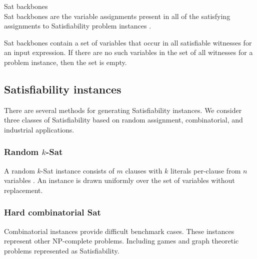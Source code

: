 \begin{definition}
{\sc Sat} backbones\\
{\sc Sat} backbones are the variable assignments present in all of the satisfying assignments to {\sc Satisfiability} problem instances \cite{Zhang2001}. 

\end{definition}

{\sc Sat} backbones contain a set of variables that occur in all satisfiable witnesses for an input expression.  If there are no such variables in the set of all witnesses for a problem instance, then the set is empty.

	\subsection{{\sc Satisfiability} instances}
		
There are several methods for generating {\sc Satisfiability} instances.  We consider three classes of {\sc Satisfiability} based on random assignment, combinatorial, and industrial applications.
	
\subsubsection{Random $k$-{\sc Sat}}
A random $k$-{\sc Sat} instance consists of $m$ clauses with $k$ literals per-clause from $n$ variables \cite{wilsonKsat}.  An instance is drawn uniformly over the set of variables without replacement.

		

\subsubsection{Hard combinatorial {\sc Sat}}

Combinatorial instances provide difficult benchmark cases.  These instances represent other \textsf{NP-complete} problems.  Including games and graph theoretic problems represented as {\sc Satisfiability}. 
		
